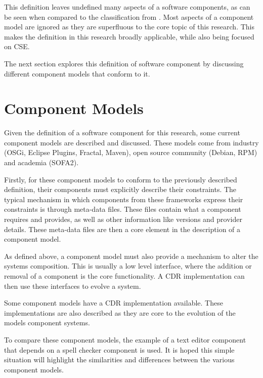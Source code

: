This definition leaves undefined many aspects of a software components, as can be seen when compared to the classification from \citep{Crnkovic2011}.
Most aspects of a component model are ignored as they are superfluous to the core topic of this research.
This makes the definition in this research broadly applicable, while also being focused on CSE.

The next section explores this definition of software component by discussing different component models that conform to it.

\section{Component Models}
\label{background.models}
Given the definition of a software component for this research, some current component models are described and discussed.
These models come from industry (OSGi, Eclipse Plugins, Fractal, Maven), open source community (Debian, RPM) and academia (SOFA2).

Firstly, for these component models to conform to the previously described definition, their components must explicitly describe their constraints.
The typical mechanism in which components from these frameworks express their constraints is through meta-data files.
These files contain what a component requires and provides, as well as other information like versions and provider details.
These meta-data files are then a core element in the description of a component model.

As defined above, a component model must also provide a mechanism to alter the systems composition.
This is usually a low level interface, where the addition or removal of a component is the core functionality.
A CDR implementation can then use these interfaces to evolve a system.

Some component models have a CDR implementation available.
These implementations are also described as they are core to the evolution of the models component systems.

To compare these component models, the example of a text editor component that depends on a spell checker component is used.
It is hoped this simple situation will highlight the similarities and differences between the various component models.

